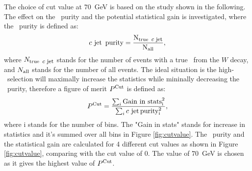 \documentclass[letterpaper,12pt]{article}
\newcommand\cjetineq{\mathop{\mbox{$c$ $\rm{jet}$}}}
\newcommand\cjetunder{\mathop{\footnotesize{\mbox{$c$ $\rm{jet}$}}}\normalsize}
\begin{document}
The choice of cut value at $70$~GeV is based on the
study shown in the following. 
The effect on the \cjet\ purity and the potential statistical gain is investigated, 
where the \cjet\ purity is defined as:
\begin{equation}
\cjetineq\ \rm{purity} = \frac{N_{\rm{true}\ \cjetunder}}{N_{\rm{all}}},
\end{equation}
where $N_{\rm{true}\ \cjetunder}$ stands for the number of events with a 
true \cjet\ from the $W$ decay, and $N_{\rm{all}}$ stands for the number of all events. 
The ideal situation is the high-\pt\ selection will maximally increase the 
statistics while mininally decreasing the \cjet\ purity, therefore a figure of merit $P^{\rm{Cut}}$
is defined as:
\[P^{\rm{Cut}} = \frac{\sum_i{\rm{Gain\ in\ stats}^2_i}}{\sum_i{\cjetineq \rm{purity}^2_i }}, \]
where i stands for the number of bins. The "Gain in stats" stands for increase in 
statistics and it's summed over all bins in Figure \ref{fig:cutvalue}.
The \cjet\ purity and the statistical gain are calculated for 4 different cut 
values as shown in Figure \ref{fig:cutvalue}, comparing with the cut value of 0. 
The value of $70$~GeV is chosen as it gives the highest value of $P^{\rm{Cut}}$. 
\end{document}
